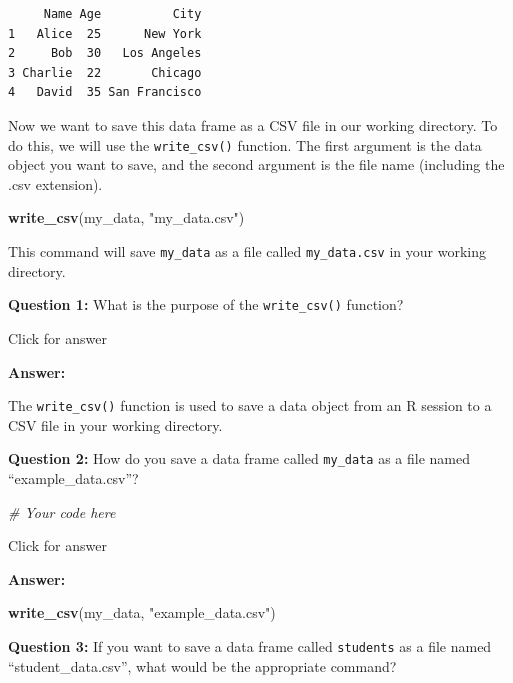 \documentclass[
]{book}
\newenvironment{Shaded}{\begin{snugshade}}{\end{snugshade}}
\newcommand{\CommentTok}[1]{\textcolor[rgb]{0.56,0.35,0.01}{\textit{#1}}}
\newcommand{\FunctionTok}[1]{\textcolor[rgb]{0.13,0.29,0.53}{\textbf{#1}}}
\newcommand{\NormalTok}[1]{#1}
\newcommand{\StringTok}[1]{\textcolor[rgb]{0.31,0.60,0.02}{#1}}
\begin{document}
\begin{verbatim}
     Name Age          City
1   Alice  25      New York
2     Bob  30   Los Angeles
3 Charlie  22       Chicago
4   David  35 San Francisco
\end{verbatim}

Now we want to save this data frame as a CSV file in our working directory. To do this, we will use the \texttt{write\_csv()} function. The first argument is the data object you want to save, and the second argument is the file name (including the .csv extension).

\begin{Shaded}
\begin{Highlighting}[]
\FunctionTok{write\_csv}\NormalTok{(my\_data, }\StringTok{"my\_data.csv"}\NormalTok{)}
\end{Highlighting}
\end{Shaded}

This command will save \texttt{my\_data} as a file called \texttt{my\_data.csv} in your working directory.

\textbf{Question 1:} What is the purpose of the \texttt{write\_csv()} function?

Click for answer

\textbf{Answer:}

The \texttt{write\_csv()} function is used to save a data object from an R session to a CSV file in your working directory.

\textbf{Question 2:} How do you save a data frame called \texttt{my\_data} as a file named ``example\_data.csv''?

\begin{Shaded}
\begin{Highlighting}[]
\CommentTok{\# Your code here}
\end{Highlighting}
\end{Shaded}

Click for answer

\textbf{Answer:}

\begin{Shaded}
\begin{Highlighting}[]
\FunctionTok{write\_csv}\NormalTok{(my\_data, }\StringTok{"example\_data.csv"}\NormalTok{)}
\end{Highlighting}
\end{Shaded}

\textbf{Question 3:} If you want to save a data frame called \texttt{students} as a file named ``student\_data.csv'', what would be the appropriate command?
\end{document}

